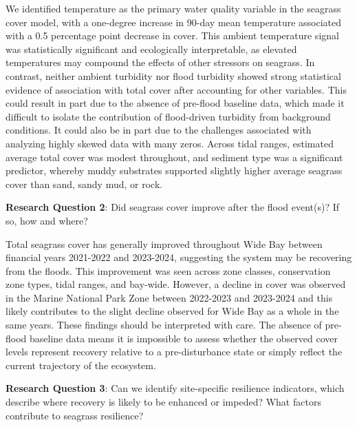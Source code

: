 \documentclass[
  letterpaper,
  DIV=11,
  numbers=noendperiod]{scrartcl}
\begin{document}
We identified temperature as the primary water quality variable in the
seagrass cover model, with a one-degree increase in 90-day mean
temperature associated with a 0.5 percentage point decrease in cover.
This ambient temperature signal was statistically significant and
ecologically interpretable, as elevated temperatures may compound the
effects of other stressors on seagrass. In contrast, neither ambient
turbidity nor flood turbidity showed strong statistical evidence of
association with total cover after accounting for other variables. This
could result in part due to the absence of pre-flood baseline data,
which made it difficult to isolate the contribution of flood-driven
turbidity from background conditions. It could also be in part due to
the challenges associated with analyzing highly skewed data with many
zeros. Across tidal ranges, estimated average total cover was modest
throughout, and sediment type was a significant predictor, whereby muddy
substrates supported slightly higher average seagrass cover than sand,
sandy mud, or rock.

\textbf{Research Question 2}: Did seagrass cover improve after the flood
event(s)? If so, how and where?

Total seagrass cover has generally improved throughout Wide Bay between
financial years 2021-2022 and 2023-2024, suggesting the system may be
recovering from the floods. This improvement was seen across zone
classes, conservation zone types, tidal ranges, and bay-wide. However, a
decline in cover was observed in the Marine National Park Zone between
2022-2023 and 2023-2024 and this likely contributes to the slight
decline observed for Wide Bay as a whole in the same years. These
findings should be interpreted with care. The absence of pre-flood
baseline data means it is impossible to assess whether the observed
cover levels represent recovery relative to a pre-disturbance state or
simply reflect the current trajectory of the ecosystem.

\textbf{Research Question 3}: Can we identify site-specific resilience
indicators, which describe where recovery is likely to be enhanced or
impeded? What factors contribute to seagrass resilience?
\end{document}
